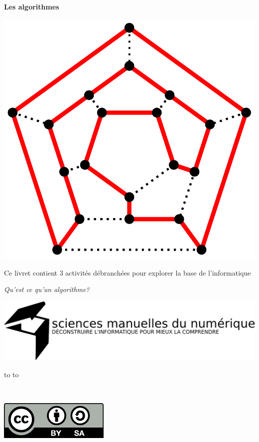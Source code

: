 \documentclass[a7paper,pagesize,DIV=14,10pt]{scrbook}
\begin{document}
\begin{center}
  \textbf{\huge Les algorithmes}
  
  \includegraphics[width=.5\linewidth]{img/Hamiltonian_path.pdf}
\end{center}

\vspace{-.5\baselineskip} %
Ce livret contient 3 activités débranchées pour explorer la base de
l'informatique

\medskip
\centerline{\large\textit{Qu'est ce qu'un algorithme?}}

\bigskip
\centerline{  \includegraphics[width=.9\linewidth]{img/logo_SMN.pdf}}


\begin{minipage}{.8\linewidth}
  \begin{spacing}{.5}
    \hbox to \linewidth{\tiny~\hfill Vous pouvez copier, modifier et diffuser librement ce document,}
    \hbox to \linewidth{\tiny~\hfill à la seule condition de laisser ces mêmes droits à vos lecteurs.}
  \end{spacing}
\end{minipage}%
~
\begin{minipage}[b]{.16\linewidth}
  \includegraphics[width=\linewidth]{img/logo_by-sa.pdf}
\end{minipage}%
\end{document}

